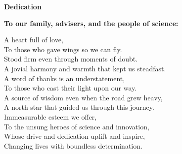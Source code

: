\begin{center}
	\textbf{Dedication}
	
	\textbf{To our family, advisers, and the people of science:}
	
	\vspace{0.85cm}
	A heart full of love, \\
	To those who gave wings so we can fly. \\
	Stood firm even through moments of doubt. \\
	A jovial harmony and warmth that kept us steadfast. \\
	
	\vspace{0.75cm}
	A word of thanks is an understatement, \\
	To those who cast their light upon our way. \\
	A source of wisdom even when the road grew heavy, \\
	A north star that guided us through this journey. \\
	
	\vspace{0.75cm}
	Immeasurable esteem we offer, \\
	To the unsung heroes of science and innovation, \\
	Whose drive and dedication uplift and inspire, \\
	Changing lives with boundless determination. \\
	
\end{center}

